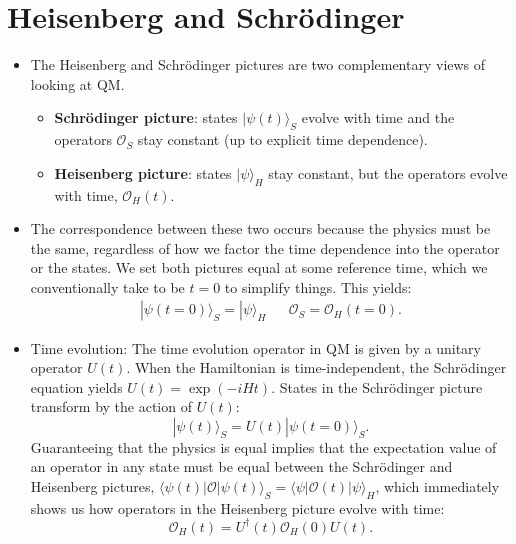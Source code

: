 \documentclass[12pt, oneside]{article}   	%
\theoremstyle{definition}
\begin{document}
\begin{answerbox}
\begin{itemize}
\end{itemize}
\end{answerbox}

\section*{Heisenberg and Schr\"odinger}
\begin{itemize}

	\item The Heisenberg and Schr\"odinger pictures are two complementary views of looking at QM. 
	\begin{itemize}
		\item \textbf{Schr\"odinger picture}: states $|\psi(t)\rangle_S$ evolve with time and the operators $\mathcal{O}_S$ stay constant (up to explicit time dependence). 
		\item \textbf{Heisenberg picture}: states $|\psi\rangle_H$ stay constant, but the operators evolve with time, $\mathcal{O}_H(t)$.
	\end{itemize}
	
	\item The correspondence between these two occurs because the physics must be the same, regardless of how we factor the time dependence into the operator or the states. We set both pictures equal at some reference time, which we conventionally take to be $t = 0$ to simplify things. This yields:
	\begin{align}
		|\psi(t = 0)\rangle_S = |\psi\rangle_H && \mathcal O_S = \mathcal O_H(t = 0).
	\end{align}
	
	\item Time evolution: The time evolution operator in QM is given by a unitary operator $U(t)$. When the Hamiltonian is time-independent, the Schr\"odinger equation yields $U(t) = \exp\left(-i H t\right)$. States in the Schr\"odinger picture transform by the action of $U(t)$:
	\begin{equation}
		|\psi(t)\rangle_S = U(t) |\psi(t = 0)\rangle_S.
	\end{equation}
	Guaranteeing that the physics is equal implies that the expectation value of an operator in any state must be equal between the Schr\"odinger and Heisenberg pictures, $\langle\psi(t)| \mathcal{O} |\psi(t)\rangle_S = \langle\psi | \mathcal{O}(t) | \psi\rangle_H$, which immediately shows us how operators in the Heisenberg picture evolve with time:
	\begin{equation}
		\mathcal{O}_H(t) = U^\dagger(t) \mathcal{O}_H(0) U(t).\label{eq:heisenberg_ops}
	\end{equation}
	

\end{itemize}
\end{document}
